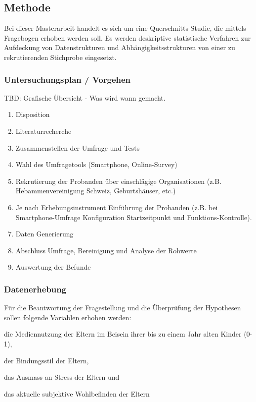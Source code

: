 \subsection{Methode}
Bei dieser Masterarbeit handelt es sich um eine Querschnitts-Studie, die mittels Fragebogen erhoben werden soll. 
Es werden deskriptive statistische Verfahren zur Aufdeckung von Datenstrukturen und Abhängigkeitsstrukturen von einer zu rekrutierenden Stichprobe eingesetzt.
\subsubsection{Untersuchungsplan / Vorgehen}
TBD: Grafische Übersicht - Was wird wann gemacht.
\begin{enumerate}
    \item Disposition
    \item Literaturrecherche
    \item Zusammenstellen der Umfrage und Tests
    \item Wahl des Umfragetools (Smartphone, Online-Survey)
    \item Rekrutierung der Probanden über einschlägige Organisationen (z.B. Hebammenvereinigung Schweiz, Geburtshäuser, etc.)
    \item Je nach Erhebungsinstrument Einführung der Probanden (z.B. bei Smartphone-Umfrage Konfiguration Startzeitpunkt und Funktions-Kontrolle).
    \item Daten Generierung
    \item Abschluss Umfrage, Bereinigung und Analyse der Rohwerte
    \item Auswertung der Befunde
\end{enumerate}
\subsubsection{Datenerhebung}
Für die Beantwortung der Fragestellung und die Überprüfung der Hypothesen sollen folgende Variablen erhoben werden: 
\begin{seriate}
    \item die Mediennutzung der Eltern im Beisein ihrer bis zu einem Jahr alten Kinder (0-1),
    \item der Bindungsstil der Eltern, 
    \item das Ausmass an Stress der Eltern und
    \item das aktuelle subjektive Wohlbefinden der Eltern
\end{seriate}

